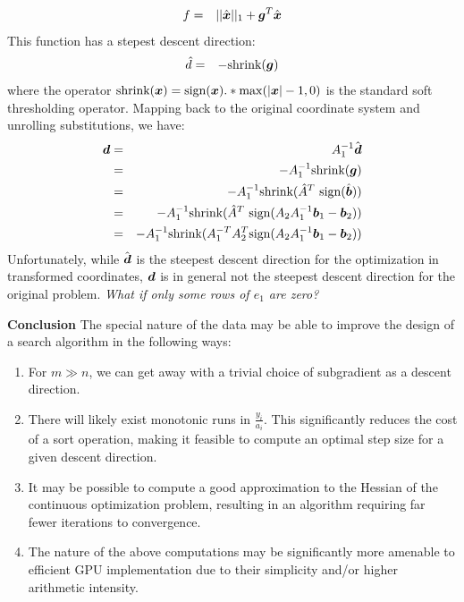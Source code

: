 \documentclass[9.5pt,journal,final,finalsubmission,twocolumn]{IEEEtran}
\begin{document}
\begin{eqnarray}
f &=& ||\hat{{\boldsymbol{x}}}||_1 + \boldsymbol{g}^T \hat {{\boldsymbol{x}}}
\end{eqnarray}
This function has a stepest descent direction:
\begin{eqnarray}
\hat d &=& -{\text{shrink}}(\boldsymbol{g})
\end{eqnarray}
where the operator ${\text{shrink}}({\boldsymbol{x}}) = {\text{sign}}({\boldsymbol{x}}).*\max(|{\boldsymbol{x}}|-1,0)$ is the standard
soft thresholding operator. Mapping back to the original coordinate system and unrolling substitutions,
we have:
\begin{eqnarray}
\boldsymbol{d} &=& A_1^{-1} \hat {\boldsymbol{d}} \\
 &=& -A_1^{-1} {\text{shrink}}(\boldsymbol{g}) \\
 &=& -A_1^{-1} {\text{shrink}}(\hat A ^T \ {\text{sign}}(\hat {\boldsymbol{b}})) \\
 &=& -A_1^{-1} {\text{shrink}}(\hat A ^T \ {\text{sign}}(A_2 A_1^{-1} \boldsymbol{b}_1 - \boldsymbol{b}_2)) \\
 &=& -A_1^{-1} {\text{shrink}}(A_1^{-T}A_2^T {\text{sign}}(A_2 A_1^{-1} \boldsymbol{b}_1 - \boldsymbol{b}_2))
\end{eqnarray}
Unfortunately, while $\hat {\boldsymbol{d}}$ is the steepest descent direction for the optimization in transformed coordinates,
$\boldsymbol{d}$ is in general not the steepest descent direction for the original problem.  
{\em What if only some rows of $e_1$ are zero?}

{\bf Conclusion } The special nature of the data may be able to improve the design of a search algorithm in the following ways:
\begin{enumerate}
\item For $m \gg n$, we can get away with a trivial choice of subgradient as a descent direction.
\item There will likely exist monotonic runs in $\frac{y_i}{a_i}$.  This significantly reduces the cost of a sort operation, making it feasible to compute an optimal step size for a given descent direction.  
\item It may be possible to compute a good approximation to the Hessian of the continuous optimization problem, resulting in an algorithm requiring far fewer iterations to convergence.  
\item The nature of the above computations may be significantly more amenable to efficient GPU implementation due to their simplicity and/or higher arithmetic intensity.
\end{enumerate}
\end{document}
